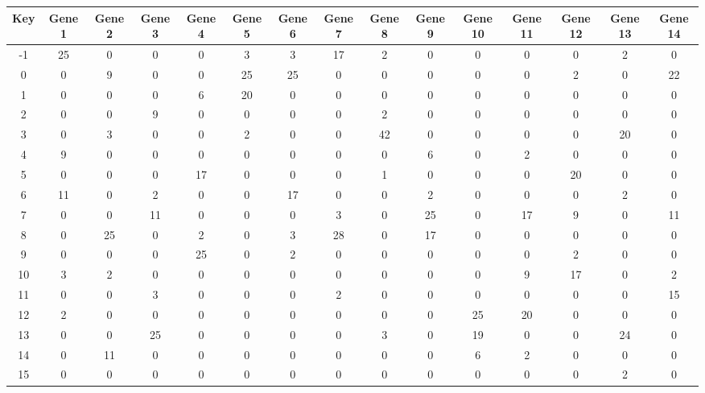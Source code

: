 \begin{tabular}{|c|c|c|c|c|c|c|c|c|c|c|c|c|c|c|}
\hline
Key & Gene 1 & Gene 2 & Gene 3 & Gene 4 & Gene 5 & Gene 6 & Gene 7 & Gene 8 & Gene 9 & Gene 10 & Gene 11 & Gene 12 & Gene 13 & Gene 14 \\
\hline
-1 & 25 & 0 & 0 & 0 & 3 & 3 & 17 & 2 & 0 & 0 & 0 & 0 & 2 & 0 \\
0 & 0 & 9 & 0 & 0 & 25 & 25 & 0 & 0 & 0 & 0 & 0 & 2 & 0 & 22 \\
1 & 0 & 0 & 0 & 6 & 20 & 0 & 0 & 0 & 0 & 0 & 0 & 0 & 0 & 0 \\
2 & 0 & 0 & 9 & 0 & 0 & 0 & 0 & 2 & 0 & 0 & 0 & 0 & 0 & 0 \\
3 & 0 & 3 & 0 & 0 & 2 & 0 & 0 & 42 & 0 & 0 & 0 & 0 & 20 & 0 \\
4 & 9 & 0 & 0 & 0 & 0 & 0 & 0 & 0 & 6 & 0 & 2 & 0 & 0 & 0 \\
5 & 0 & 0 & 0 & 17 & 0 & 0 & 0 & 1 & 0 & 0 & 0 & 20 & 0 & 0 \\
6 & 11 & 0 & 2 & 0 & 0 & 17 & 0 & 0 & 2 & 0 & 0 & 0 & 2 & 0 \\
7 & 0 & 0 & 11 & 0 & 0 & 0 & 3 & 0 & 25 & 0 & 17 & 9 & 0 & 11 \\
8 & 0 & 25 & 0 & 2 & 0 & 3 & 28 & 0 & 17 & 0 & 0 & 0 & 0 & 0 \\
9 & 0 & 0 & 0 & 25 & 0 & 2 & 0 & 0 & 0 & 0 & 0 & 2 & 0 & 0 \\
10 & 3 & 2 & 0 & 0 & 0 & 0 & 0 & 0 & 0 & 0 & 9 & 17 & 0 & 2 \\
11 & 0 & 0 & 3 & 0 & 0 & 0 & 2 & 0 & 0 & 0 & 0 & 0 & 0 & 15 \\
12 & 2 & 0 & 0 & 0 & 0 & 0 & 0 & 0 & 0 & 25 & 20 & 0 & 0 & 0 \\
13 & 0 & 0 & 25 & 0 & 0 & 0 & 0 & 3 & 0 & 19 & 0 & 0 & 24 & 0 \\
14 & 0 & 11 & 0 & 0 & 0 & 0 & 0 & 0 & 0 & 6 & 2 & 0 & 0 & 0 \\
15 & 0 & 0 & 0 & 0 & 0 & 0 & 0 & 0 & 0 & 0 & 0 & 0 & 2 & 0 \\
\hline
\end{tabular}